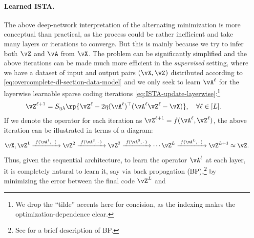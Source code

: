 \documentclass[../../book-main.tex]{subfiles}
\begin{document}
    \paragraph{Learned ISTA.} The above deep-network  interpretation of the
    alternating minimization is more conceptual than practical, as
    the process could
    be rather inefficient and take many layers or iterations to converge.
    But this
    is mainly because we try to infer both \(\vZ\) and \(\vA\) from \(\vX\).
    The problem can be significantly simplified and the above
    iterations can be made
    much more efficient in the \textit{supervised} setting, where we
    have a dataset of input
    and output pairs \((\vX, \vZ)\) distributed according to
    \eqref{eq:overcomplete-dl-section-data-model} and we only seek to learn
    \(\vA^\ell\) for the layerwise learnable sparse coding iterations
    \eqref{eq:ISTA-update-layerwise}:\footnote{We drop the ``tilde'' accents
        here for concision, as the indexing makes the
    optimization-dependence clear.}
    \begin{align}
        & \vZ^{\ell + 1} = S_{\eta\lambda}\rp{\vZ^{\ell} -
        2\eta(\vA^{\ell})^{\top}(\vA^\ell\vZ^{\ell} - \vX)}, \quad
        \forall \ell \in [L].
    \end{align}
    If we denote the operator for each iteration as $\vZ^{\ell + 1} =
    f(\vA^\ell, \vZ^\ell)$, the above iteration can be illustrated in
    terms of a diagram:
    \begin{equation*}
        \vX, \vZ^1 \xrightarrow{\hspace{1mm} f(\vA^1,\,\cdot\,)
        \hspace{1mm}}  \vZ^2 \xrightarrow{\hspace{1mm}
        f(\vA^2,\,\cdot\,) \hspace{1mm}}  \vZ^3
        \xrightarrow{\hspace{1mm} f(\vA^3,\,\cdot\,) \hspace{1mm}}
        \cdots \vZ^{L}  \xrightarrow{\hspace{1mm}
        f(\vA^{L},\,\cdot\,) \hspace{1mm}} \vZ^{L + 1} \approx \vZ.
        \label{eqn:deep-sparse-encoding}
    \end{equation*}
    Thus, given the sequential architecture, to learn the operator
    \(\vA^\ell\) at
    each layer, it is completely natural to learn it, say via back propagation
    (BP),\footnote{See  for a brief description of
    BP.} by minimizing the error between the final code $\vZ^L$ and
\end{document}
